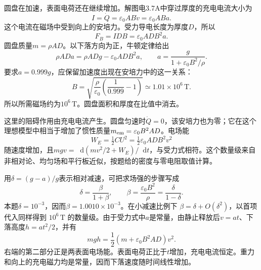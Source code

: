 \documentclass[UTF8,fontset=fandol,a4paper,11pt]{ctexart}
\newcommand{\dd}{\mathop{}\!\mathrm{d}}
\begin{document}
圆盘在加速，表面电荷还在继续增加。解图电3.7A中穿过厚度的充电电流大小为
\[
I=\dot Q=\varepsilon_0 AB\dot v=\varepsilon_0 ABa.
\]
这个电流在磁场中受到向上的安培力。受力导电长度为厚度$D$，所以
\[
F_B=IDB=\varepsilon_0 ADB^2a.
\]
圆盘质量$m=\rho AD$。以下落方向为正，牛顿定律给出
\[
\rho ADa=\rho ADg-\varepsilon_0 ADB^2a,
\qquad
\boxed{a=\frac{g}{1+\varepsilon_0 B^2/\rho}}.
\]
要求$a=0.999g$，应保留加速度出现在安培力中的这一关系：
\[
B=\sqrt{\frac{\rho}{\varepsilon_0}\left(\frac1{0.999}-1\right)}
\simeq1.01\times10^6\,\mathrm T.
\]
所以所需磁场约为$10^6\,\mathrm T$。圆盘面积和厚度在比值中消去。

这里的阻碍作用由充电电流产生。圆盘匀速时$\dot Q=0$，该安培力也为零；它在这个理想模型中相当于增加了惯性质量$m_{\rm em}=\varepsilon_0 B^2AD$。电场能
\[
W_E=\tfrac12CU^2=\tfrac12\varepsilon_0 ADB^2v^2
\]
随速度增加，且$mgv=\dd(mv^2/2+W_E)/\dd t$，与受力式相符。这个数量级来自非相对论、均匀场和平行板近似，按题给的密度与零电阻取值计算。

用$\delta=(g-a)/g$表示相对减速，可把求场强的步骤写成
\[
\delta=\frac{\beta}{1+\beta},\qquad
\beta=\frac{\varepsilon_0B^2}{\rho}=\frac{\delta}{1-\delta}.
\]
本题$\delta=10^{-3}$，因而$\beta=1.0010\times10^{-3}$。在小减速比例下 $\beta=\delta+O(\delta^2)$，以首项代入同样得到 $10^6\,\mathrm T$ 的数量级。由于受力式中$a$是常量，由静止释放后$v=at$、下落高度$h=at^2/2$，并有
\[
mgh=\frac12(m+\varepsilon_0B^2AD)v^2.
\]
右端的第二部分正是两表面电场能。表面电荷正比于$t$增加，充电电流恒定。重力和向上的充电磁力均是常量，因而下落速度随时间线性增加。
\end{document}
